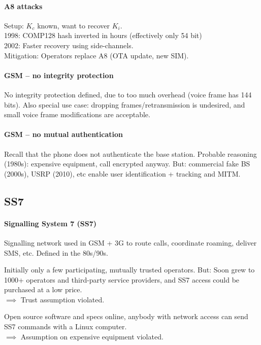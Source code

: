 \paragraph{A8 attacks}
Setup: $K_c$ known, want to recover $K_i$.
\\
1998: COMP128 hash inverted in hours (effectively only 54 bit)\\
2002: Faster recovery using side-channels.
\\
Mitigation: Operators replace A8 (OTA update, new SIM).

\paragraph{GSM -- no integrity protection}
No integrity protection defined, due to too much overhead (voice frame has 144 bits).
Also special use case: dropping frames/retransmission is undesired, and small voice frame modifications are acceptable.

\paragraph{GSM -- no mutual authentication}
Recall that the phone does not authenticate the base station.
Probable reasoning (1980s): expensive equipment, call encrypted anyway.
But: commercial fake BS (2000s), USRP (2010), etc enable user identification + tracking and MITM.


\subsection{SS7}

\paragraph{Signalling System 7 (SS7)}
Signalling network used in GSM + 3G to route calls, coordinate roaming, deliver SMS, etc.
Defined in the 80s/90s.

Initially only a few participating, mutually trusted operators.
But: Soon grew to 1000+ operators and third-party service providers, and SS7 access could be purchased at a low price.\\
$\implies$ Trust assumption violated.

Open source software and specs online, anybody with network access can send SS7 commands with a Linux computer.\\
$\implies$ Assumption on expensive equipment violated.

